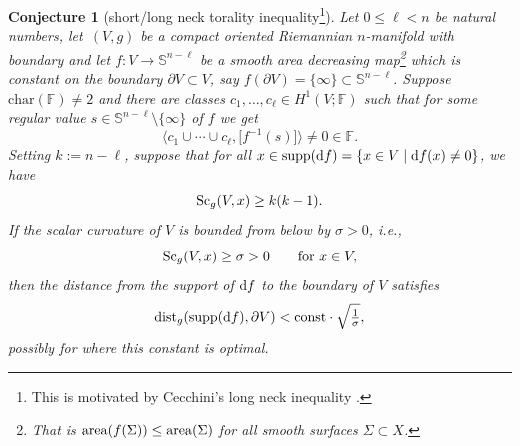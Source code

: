 \documentclass[pdftex]{sigma}
\numberwithin{equation}{section}
\newtheorem{Conjecture}[Theorem]{Conjecture}
 { \theoremstyle{definition}
\newtheorem{Definition}[Theorem]{Definition}
\newtheorem{Note}[Theorem]{Note}
\newtheorem{Example}[Theorem]{Example}
\newtheorem{Remark}[Theorem]{Remark}
}
\newcommand{\F}{\mathbb{F}}
\newcommand{\SSS}{\mathbb{S}}
\newcommand{\charac}{\mathrm{char}}
\newcommand{\Sc}{{\rm Sc}}
\begin{document}
\begin{Conjecture}[short/long neck torality inequality\footnote{This is motivated by Cecchini's long neck inequality \cite{Ce2020}.}]
\label{shortneck}
Let $0 \leq \ell < n$ be natural numbers, let~$(V,g)$ be a compact oriented Riemannian $n$-manifold with boundary and let
$f \colon  V\to \SSS^{n-\ell}$
be a smooth {\it area decreasing} map\footnote{That is ${\rm area}(f(\Sigma)) \leq {\rm area}(\Sigma)$ for all smooth surfaces $\Sigma\subset X$.} which is constant on the boundary $\partial V\subset V $, say $f(\partial V)=\{ \infty \}\subset \SSS^{n-\ell}$.
Suppose $\charac(\F) \neq 2$ and there are classes $c_1, \ldots, c_\ell \in H^1(V; \F)$ such that for some regular value $s \in \SSS^{n-\ell} \setminus \{ \infty\}$ of $f$ we get
\[
 \bigl\langle c_1 \cup \cdots \cup c_\ell, \bigl[ f^{-1}(s)\bigr] \bigr\rangle \neq 0 \in \F .
\]
Setting $k := n - \ell$, suppose that for all $x \in \operatorname{supp}( {\rm d}f) = \{ x \in V \mid {\rm d}f(x) \neq 0\}$, we have
\[
 \Sc_g(V, x) \geq k(k-1) .
\]
If the scalar curvature of $V$ is bounded from below by $\sigma > 0$, i.e.,
\[
 \Sc_g(V,x)\geq \sigma>0 \qquad \textrm{for } x\in V,
 \]
then the distance from the support of ${\rm d}f$ to the boundary of $V$ satisfies
\[
 {\rm dist}_g ( \operatorname{supp}({\rm d}f), \partial V) < {\rm const} \cdot \sqrt{\tfrac {1}{\sigma}},
 \]
 possibly for  where this constant is optimal.
 \end{Conjecture}
\end{document}
